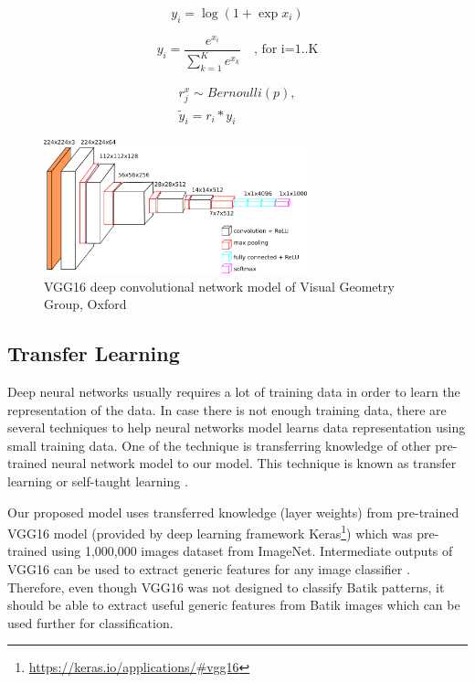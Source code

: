 \documentclass[conference, compsoc]{IEEEtran}
\begin{document}
\begin{equation}
y_{i}=\log(1+\exp x _{i})
\label{eq_relu}
\end{equation}

\begin{equation}
y_{i}={\frac {e^{x _{i}}}{\sum _{k=1}^K e^{x _{k}}}} \quad \text{, for i=1..K}
\label{eq_softmax}
\end{equation}

\begin{align}
r_{j}^{x} \sim Bernoulli(p), \nonumber \\
\tilde{y} _{i}= r _{i} * y _{i}
\label{eq_dropout}
\end{align}


\begin{figure}[h]
	\begin{center}
		\includegraphics[width=3.0in]{../vgg16}
		\renewcommand{\figurename}{Fig.}		
		\caption{VGG16 deep convolutional network model of Visual Geometry Group, Oxford}
		\label{fig_vgg16}
	\end{center}
\end{figure}

\subsection{Transfer Learning}

Deep neural networks usually requires a lot of training data in order to learn the representation of the data. In case there is not enough training data, there are several techniques to help neural networks model learns data representation using small training data. One of the technique is transferring knowledge of other pre-trained neural network model to our model. This technique is known as transfer learning or self-taught learning \cite{raina2007self}.

Our proposed model uses transferred knowledge (layer weights) from pre-trained VGG16 model (provided by deep learning framework Keras\footnote{\url{https://keras.io/applications/#vgg16}}) which was pre-trained using 1,000,000 images dataset from ImageNet. Intermediate outputs of VGG16 can be used to extract generic features for any image classifier \cite{fischer2014descriptor}. Therefore, even though VGG16 was not designed to classify Batik patterns, it should be able to extract useful generic features from Batik images which can be used further for classification. 
\end{document}
